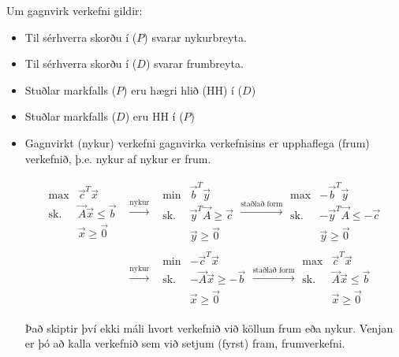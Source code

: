 \begin{aths}Um gagnvirk verkefni gildir:
\begin{itemize}
\item Til sérhverra skorðu í ($P$) svarar nykurbreyta.
\item Til sérhverra skorðu í ($D$) svarar frumbreyta.
\item Stuðlar markfalls ($P$) eru hægri hlið (HH) í ($D$)
\item Stuðlar markfalls ($D$) eru HH í ($P$)
\item Gagnvirkt (nykur) verkefni gagnvirka verkefnisins er upphaflega (frum) verkefnið, þ.e. nykur af nykur er frum. 

\begin{lausn}
{\scriptsize
\begin{eqnarray*}
\begin{array}{lc} \max & \vec{c}^T\vec{x}\\ \textrm{sk.}&\vec{A}\vec{x}\leq \vec{b} \\ & \vec{x}\geq\vec{0}\end{array}
&\stackrel{\textrm{nykur}}{\rightarrow}&
\begin{array}{lc} \min & \vec{b}^T\vec{y}\\ \textrm{sk.}&\vec{y}^T\vec{A}\geq \vec{c} \\ & \vec{y}\geq\vec{0}\end{array} 
\stackrel{\textrm{staðlað form}}{\rightarrow}
\begin{array}{lc} \max & -\vec{b}^T\vec{y}\\ \textrm{sk.}&-\vec{y}^T\vec{A}\leq -\vec{c} \\ & \vec{y}\geq\vec{0}\end{array} 
\\&\stackrel{\textrm{nykur}}{\rightarrow}&
\begin{array}{lc} \min & -\vec{c}^T\vec{x}\\ \textrm{sk.}&-\vec{A}\vec{x}\geq -\vec{b} \\ & \vec{x}\geq\vec{0}\end{array} 
\stackrel{\textrm{staðlað form}}{\rightarrow}
\begin{array}{lc} \max & \vec{c}^T\vec{x}\\ \textrm{sk.}&\vec{A}\vec{x}\leq \vec{b} \\ & \vec{x}\geq\vec{0}\end{array}  
\end{eqnarray*}}\end{lausn}
Það skiptir því ekki máli hvort verkefnið við köllum frum eða nykur. Venjan er þó að kalla verkefnið sem við setjum (fyrst) fram, frumverkefni. 

\end{itemize}
\end{aths}
